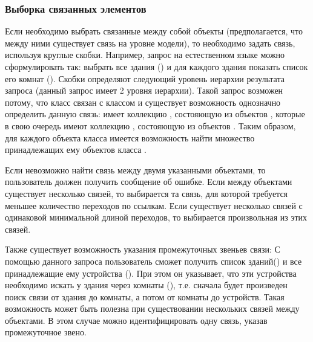 \subsubsection{Выборка связанных элементов}\label{tied_queries}
Если необходимо выбрать связанные между собой объекты (предполагается, что между ними
существует связь на уровне модели), то необходимо задать связь, используя круглые скобки.
Например, запрос 
на естественном языке можно сформулировать так: выбрать все здания () и для каждого
здания показать список его комнат (). Скобки определяют следующий уровень иерархии
результата запроса (данный запрос имеет 2 уровня иерархии). Такой запрос возможен потому, что класс  связан с
классом  и существует возможность однозначно определить данную связь:
 имеет коллекцию , состояющую из объектов , которые в 
свою очередь имеют коллекцию , состояющую из объектов . Таким образом, 
для каждого объекта класса  имеется возможность найти множество принадлежащих ему
объектов класса .


Если невозможно найти связь между двумя указанными объектами, то пользователь должен
получить сообщение об ошибке. Если между объектами существует несколько
связей, то выбирается та связь, для которой требуется меньшее количество переходов по ссылкам.
Если существует несколько связей с одинаковой минимальной длиной переходов, то 
выбирается произвольная из этих связей.

Также существует возможность указания промежуточных звеньев связи:
С помощью данного запроса пользователь сможет получить список зданий() и все 
принадлежащие ему устройства (). При этом он указывает, что эти устройства необходимо
искать у здания через комнаты (), т.е. сначала будет произведен поиск связи от здания
до комнаты, а потом от комнаты до устройств. Такая возможность может быть полезна при 
существовании нескольких связей между объектами. В этом случае можно идентифицировать
одну связь, указав промежуточное звено. 

